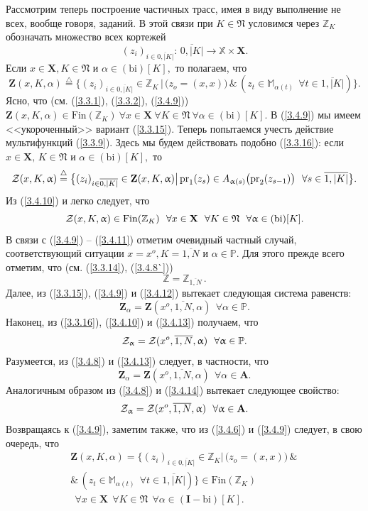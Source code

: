\documentclass[11pt,twoside]{report}
\newcommand{\bfn}{\begin{equation}}
\newcommand{\efn}{\end{equation}}
\newcommand{\df}{\stackrel{\triangle}{=}}
\newcommand{\ov}{\overline}
\newcommand{\al}{\alpha}
\newcommand{\fa}{\forall}
\newcommand{\cz}{{\cal Z}}
\newcommand{\bbz}{{\mathbb Z}}
\newcommand{\bbm}{{\mathbb M}}
\newcommand{\bbx}{{\mathbb X}}
\newcommand{\bbp}{{\mathbb P}}
\begin{document}
Рассмотрим теперь построение частичных трасс, имея в виду выполнение не всех,
вообще говоря, заданий. В этой связи при $K\in\mathfrak{N}$ условимся через $\bbz_K$
обозначать множество всех кортежей
\bfn\label{3.4.8`}
(z_i)_{i\in \ov{0,|K|}}:\,\ov{0,|K|} \longrightarrow \bbx \times \mathbf{X}.
\efn
Если $x\in \mathbf{X}, K\in \mathfrak{N}$ и $\al\in (\mathrm{bi})[K],$ то
полагаем, что
\bfn\label{3.4.9}
\mathbf{Z}(x,K,\al) \df \{(z_i)_{i\in \ov{0,|K|}}\in \bbz_K\,|\,\bigl(z_o=
(x,x)\bigl)\,\&\,(z_t\in \bbm_{\al(t)}\ \ \fa t\in \ov{1,|K|})\}.
\efn
Ясно, что (см. (\ref{3.3.1}), (\ref{3.3.2}), (\ref{3.4.9})) $\mathbf{Z}(x,K,\al)
\in \mathrm{Fin}(\bbz_K)\  \fa x\in \mathbf{X}\  \fa K\in \mathfrak{N}\  \fa
\al\in (\mathrm{bi})[K].$ В (\ref{3.4.9}) мы имеем <<укороченный>> вариант
(\ref{3.3.15}). Теперь попытаемся учесть действие мультифункций (\ref{3.3.9}).
Здесь мы будем действовать подобно (\ref{3.3.16}): если $x\in \mathbf{X},\, K\in
\mathfrak{N}$ и $\al\in (\mathrm{bi})[K],$ то
\bfn\label{3.4.10}\cz(x,K,\al) \df \bigl\{(z_i)_{i\in\ov{0,|K|}}\in \mathbf{Z}
(x,K,\al) \bigl|\,\mathrm{pr}_1(z_s)\in A_{\al(s)}\bigl(\mathrm{pr}_2(z_{s-1})
\bigl)\ \ \fa s\in \ov{1,|K|}\bigl\}.
\efn
Из (\ref{3.4.10}) и \cite[(3.21)]{Cha3`} легко следует, что
\bfn\label{3.4.11}\cz(x,K,\al) \in \mathrm{Fin}(\bbz_K)\ \ \fa x\in
\mathbf{X}\ \ \fa K\in \mathfrak{N}\ \ \fa \al\in (\mathrm{bi})[K].
\efn
В связи с (\ref{3.4.9}) -- (\ref{3.4.11}) отметим очевидный частный случай,
соответствующий ситуации $x = x^o, K = \ov{1,N}$ и $\al\in \bbp.$ Для этого
прежде всего отметим, что (см. (\ref{3.3.14}), (\ref{3.4.8`}))
\bfn\label{3.4.12}\bbz = \bbz_{\ov{1,N}}\,.
\efn
Далее, из (\ref{3.3.15}), (\ref{3.4.9}) и (\ref{3.4.12}) вытекает следующая
система равенств:
\bfn\label{3.4.13}
\mathbf{Z}_\al = \mathbf{Z}(x^o,\ov{1,N},\al) \ \ \fa \al\in \bbp.
\efn
Наконец, из (\ref{3.3.16}), (\ref{3.4.10}) и (\ref{3.4.13})  получаем, что
\bfn\label{3.4.14}\cz_\al = \cz(x^o,\ov{1,N},\al) \ \ \fa \al\in \bbp.
\efn
Разумеется, из (\ref{3.4.8}) и (\ref{3.4.13}) следует, в частности, что
\bfn\label{3.4.15}
\mathbf{Z}_\al = \mathbf{Z}(x^o,\ov{1,N},\al) \ \ \fa \al\in \mathbf{A}.
\efn
Аналогичным образом из (\ref{3.4.8}) и (\ref{3.4.14}) вытекает следующее
свойство:
\bfn\label{3.4.16}\cz_\al = \cz(x^o,\ov{1,N},\al) \ \ \fa \al\in \mathbf{A}.
\efn
Возвращаясь к (\ref{3.4.9}), заметим также, что из (\ref{3.4.6}) и (\ref{3.4.9})
следует, в свою очередь, что
\begin{eqnarray}
&\mathbf{Z}(x,K,\al) = \bigl\{(z_i)_{i\in \ov{0,|K|}} \in \bbz_K\bigl|\,\bigl(z_o =
(x,x)\bigl)\,\&\,
&\nonumber\\
&\&\,(z_t\in \bbm_{\al(t)}\ \ \fa t\in \ov{1,|K|})\bigl\}\in \mathrm{Fin}
(\bbz_K)
&\nonumber\\
&\ \ \fa x\in \mathbf{X}\ \ \fa K\in \mathfrak{N}\ \ \fa \al\in (\mathbf{I}-\mathrm{bi})[K].
&\label{3.4.17}
\end{eqnarray}
\end{document}

